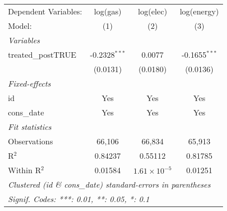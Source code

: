 
\begin{tabular}{lccc}
   \tabularnewline\midrule\midrule
   Dependent Variables: & log(gas)        & log(elec)             & log(energy)\\
   Model:               & (1)             & (2)                   & (3)\\
   \midrule \emph{Variables} &   &   &  \\
   treated\_postTRUE   & -0.2328$^{***}$ & 0.0077                & -0.1655$^{***}$\\
                        & (0.0131)        & (0.0180)              & (0.0136)\\
   \midrule \emph{Fixed-effects} &   &   &  \\
   id                   & Yes             & Yes                   & Yes\\
   cons\_date          & Yes             & Yes                   & Yes\\
   \midrule \emph{Fit statistics} &   &   &  \\
   Observations         & 66,106          & 66,834                & 65,913\\
   R$^2$                & 0.84237         & 0.55112               & 0.81785\\
   Within R$^2$         & 0.01584         & $1.61\times 10^{-5}$ & 0.01251\\
   \midrule\midrule\multicolumn{4}{l}{\emph{Clustered (id \& cons\_date) standard-errors in parentheses}}\\
   \multicolumn{4}{l}{\emph{Signif. Codes: ***: 0.01, **: 0.05, *: 0.1}}\\
\end{tabular}


